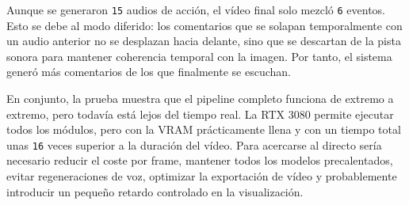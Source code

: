 Aunque se generaron \texttt{15} audios de acción, el vídeo final solo mezcló \texttt{6} eventos. Esto se debe al modo diferido: los comentarios que se solapan temporalmente con un audio anterior no se desplazan hacia delante, sino que se descartan de la pista sonora para mantener coherencia temporal con la imagen. Por tanto, el sistema generó más comentarios de los que finalmente se escuchan.

En conjunto, la prueba muestra que el pipeline completo funciona de extremo a extremo, pero todavía está lejos del tiempo real. La RTX 3080 permite ejecutar todos los módulos, pero con la VRAM prácticamente llena y con un tiempo total unas \texttt{16} veces superior a la duración del vídeo. Para acercarse al directo sería necesario reducir el coste por frame, mantener todos los modelos precalentados, evitar regeneraciones de voz, optimizar la exportación de vídeo y probablemente introducir un pequeño retardo controlado en la visualización.